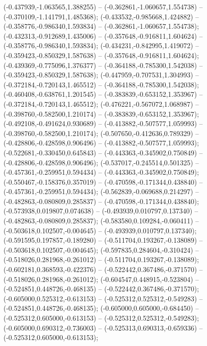  (-0.437939,-1.063565,1.388255) -- (-0.362861,-1.060657,1.554738) -- (-0.370109,-1.141791,1.485368);
 (-0.433532,-0.985668,1.424882) -- (-0.358776,-0.986340,1.593834) -- (-0.362861,-1.060657,1.554738);
 (-0.432313,-0.912689,1.435006) -- (-0.357648,-0.916811,1.604624) -- (-0.358776,-0.986340,1.593834);
 (-0.434231,-0.842995,1.419072) -- (-0.359423,-0.850329,1.587638) -- (-0.357648,-0.916811,1.604624);
 (-0.439369,-0.775096,1.376377) -- (-0.364188,-0.785300,1.542038) -- (-0.359423,-0.850329,1.587638);
 (-0.447959,-0.707531,1.304993) -- (-0.372184,-0.720143,1.465512) -- (-0.364188,-0.785300,1.542038);
 (-0.460408,-0.638761,1.201545) -- (-0.383839,-0.653152,1.353967) -- (-0.372184,-0.720143,1.465512);
 (-0.476221,-0.567072,1.068987) -- (-0.398760,-0.582500,1.210174) -- (-0.383839,-0.653152,1.353967);
 (-0.492108,-0.491624,0.930689) -- (-0.413882,-0.507577,1.059993) -- (-0.398760,-0.582500,1.210174);
 (-0.507650,-0.412636,0.789329) -- (-0.428806,-0.428598,0.906496) -- (-0.413882,-0.507577,1.059993);
 (-0.522681,-0.330450,0.645843) -- (-0.443363,-0.345902,0.750849) -- (-0.428806,-0.428598,0.906496);
 (-0.537017,-0.245514,0.501325) -- (-0.457361,-0.259951,0.594434) -- (-0.443363,-0.345902,0.750849);
 (-0.550467,-0.158376,0.357019) -- (-0.470598,-0.171344,0.438840) -- (-0.457361,-0.259951,0.594434);
 (-0.562839,-0.069688,0.214297) -- (-0.482863,-0.080809,0.285837) -- (-0.470598,-0.171344,0.438840);
 (-0.573938,0.019807,0.074638) -- (-0.493939,0.010797,0.137340) -- (-0.482863,-0.080809,0.285837);
 (-0.583580,0.109284,-0.060411) -- (-0.503618,0.102507,-0.004645) -- (-0.493939,0.010797,0.137340);
 (-0.591595,0.197857,-0.189280) -- (-0.511704,0.193267,-0.138089) -- (-0.503618,0.102507,-0.004645);
 (-0.597835,0.284604,-0.310424) -- (-0.518026,0.281968,-0.261012) -- (-0.511704,0.193267,-0.138089);
 (-0.602181,0.368593,-0.422376) -- (-0.522442,0.367486,-0.371570) -- (-0.518026,0.281968,-0.261012);
 (-0.604547,0.448915,-0.523804) -- (-0.524851,0.448726,-0.468135) -- (-0.522442,0.367486,-0.371570);
 (-0.605000,0.525312,-0.613153) -- (-0.525312,0.525312,-0.549283) -- (-0.524851,0.448726,-0.468135);
 (-0.605000,0.605000,-0.684450) -- (-0.525312,0.605000,-0.613153) -- (-0.525312,0.525312,-0.549283);
 (-0.605000,0.690312,-0.736003) -- (-0.525313,0.690313,-0.659336) -- (-0.525312,0.605000,-0.613153);
